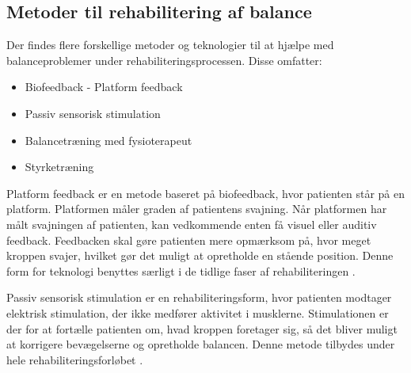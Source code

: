 \subsection{Metoder til rehabilitering af balance}

Der findes flere forskellige metoder og teknologier til at hjælpe med balanceproblemer  under rehabiliteringsprocessen. Disse omfatter: \cite{Sundhedsstyrelsen2011a}  

\begin{itemize}
\item Biofeedback - Platform feedback
\item Passiv sensorisk stimulation
\item Balancetræning med fysioterapeut
\item Styrketræning
\end{itemize}

Platform feedback er en metode baseret på biofeedback, hvor patienten står på en platform. Platformen måler graden af patientens svajning. Når platformen har målt svajningen af patienten, kan vedkommende enten få visuel eller auditiv feedback. Feedbacken skal gøre patienten mere opmærksom på, hvor meget kroppen svajer, hvilket gør det muligt at opretholde en stående position. \cite{Barclay-Goddard2004} Denne form for teknologi benyttes særligt i de tidlige faser af rehabiliteringen \cite{Sundhedsstyrelsen2011a}. 

Passiv sensorisk stimulation er en rehabiliteringsform, hvor patienten modtager elektrisk stimulation, der ikke medfører aktivitet i musklerne. Stimulationen er der for at fortælle patienten om, hvad kroppen foretager sig, så det bliver muligt at korrigere bevægelserne og opretholde balancen. \cite{Sundhedsstyrelsen2010} Denne metode tilbydes under hele rehabiliteringsforløbet \cite{Sundhedsstyrelsen2011a}.

